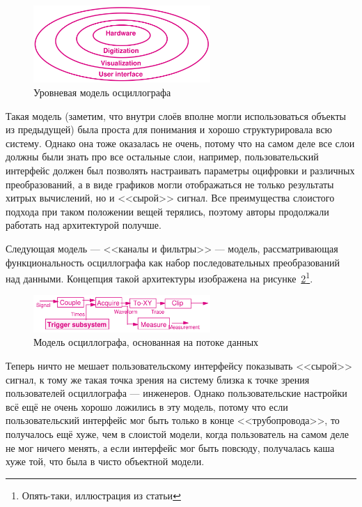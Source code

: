 \documentclass{../../text-style}
\begin{document}
\begin{figure}
    \begin{center}
        \includegraphics[width=0.6\textwidth]{oscilloscopeLayers.png}
    \end{center}
    \caption{Уровневая модель осциллографа}
    \label{figure:oscilloscopeLayers}
\end{figure}

Такая модель (заметим, что внутри слоёв вполне могли использоваться объекты из предыдущей) была проста для понимания и хорошо структурировала всю систему. Однако она тоже оказалась не очень, потому что на самом деле все слои должны были знать про все остальные слои, например, пользовательский интерфейс должен был позволять настраивать параметры оцифровки и различных преобразований, а в виде графиков могли отображаться не только результаты хитрых вычислений, но и <<сырой>> сигнал. Все преимущества слоистого подхода при таком положении вещей терялись, поэтому авторы продолжали работать над архитектурой получше.

Следующая модель --- <<каналы и фильтры>> --- модель, рассматривающая функциональность осциллографа как набор последовательных преобразований над данными. Концепция такой архитектуры изображена на рисунке~\ref{figure:oscilloscopeFilters}\footnote{Опять-таки, иллюстрация из статьи}.

\begin{figure}
    \begin{center}
        \includegraphics[width=0.6\textwidth]{oscilloscopeFilters.png}
    \end{center}
    \caption{Модель осциллографа, основанная на потоке данных}
    \label{figure:oscilloscopeFilters}
\end{figure}

Теперь ничто не мешает пользовательскому интерфейсу показывать <<сырой>> сигнал, к тому же такая точка зрения на систему близка к точке зрения пользователей осциллографа --- инженеров. Однако пользовательские настройки всё ещё не очень хорошо ложились в эту модель, потому что если пользовательский интерфейс мог быть только в конце <<трубопровода>>, то получалось ещё хуже, чем в слоистой модели, когда пользователь на самом деле не мог ничего менять, а если интерфейс мог быть повсюду, получалась каша хуже той, что была в чисто объектной модели.
\end{document}
